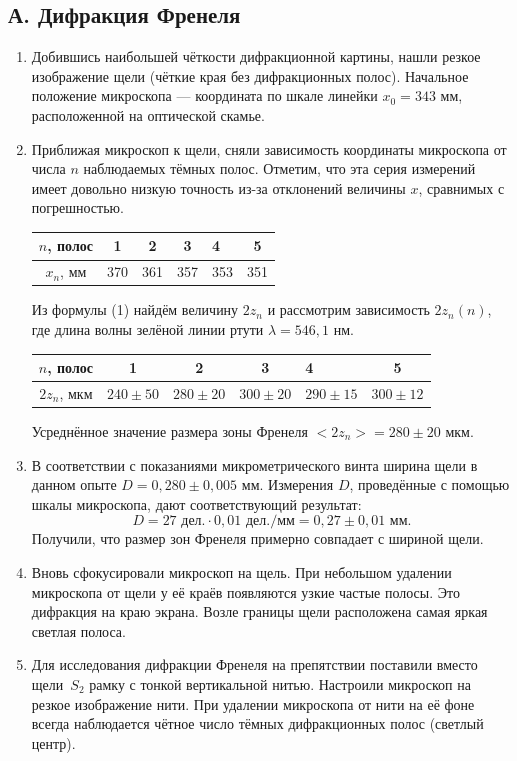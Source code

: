 \documentclass[a4paper,12pt]{article}
\begin{document}
\subsection*{А. Дифракция Френеля}
\begin{enumerate}
	\item Добившись наибольшей чёткости дифракционной картины, нашли резкое изображение щели (чёткие края без дифракционных полос). Начальное положение микроскопа --- координата по шкале линейки $x_0=343$ мм, расположенной на оптической скамье. 
	\item Приближая микроскоп к щели, сняли зависимость координаты микроскопа от числа $n$ наблюдаемых тёмных полос. Отметим, что эта серия измерений имеет довольно низкую точность из-за отклонений величины $x$, сравнимых с погрешностью.
	\begin{center}
		\begin{tabular}{|c|c|c|c|l|c|}
			\hline
			$n$, полос & 1 & 2 & 3 & 4 & 5 \\ \hline
			$x_n$, мм & 370 & 361 & 357 & 353 & 351 \\ \hline
		\end{tabular}
	\end{center}

Из формулы (1) найдём величину $2z_n$ и рассмотрим зависимость $2z_n(n)$, где длина волны зелёной линии ртути $\lambda = 546{,}1$ нм.
\begin{center}
	\begin{tabular}{|c|c|c|c|l|c|}
		\hline
		$n$, полос & 1 & 2 & 3 & 4 & 5 \\ \hline
		$2z_n$, мкм & $240\pm50$ & $280\pm20$ & $300\pm20$ & $290\pm15$ & $300\pm12$ \\ \hline
	\end{tabular}
\end{center}
Усреднённое значение размера зоны Френеля $<2z_n>=280\pm20$ мкм.
\item В соответствии с показаниями микрометрического винта ширина щели в данном опыте $D = 0{,}280\pm0{,}005$ мм. Измерения $D$, проведённые с помощью шкалы микроскопа, дают соответствующий результат: 
\begin{equation*}
D = 27\text{ дел.}\cdot 0{,}01 \text{ дел./мм} = 0{,}27\pm0{,}01\text{ мм}.
\end{equation*}
Получили, что размер зон Френеля примерно совпадает с шириной щели.

\item Вновь сфокусировали микроскоп на щель. При небольшом удалении микроскопа от щели у её краёв появляются узкие частые полосы. Это дифракция на краю экрана. Возле границы щели расположена самая яркая светлая полоса.
\item Для исследования дифракции Френеля на препятствии поставили вместо щели~$S_2$ рамку с тонкой вертикальной нитью. Настроили микроскоп на резкое изображение нити. При удалении микроскопа от нити на её фоне всегда наблюдается чётное число тёмных дифракционных полос (светлый центр).
\end{enumerate}
\end{document}
